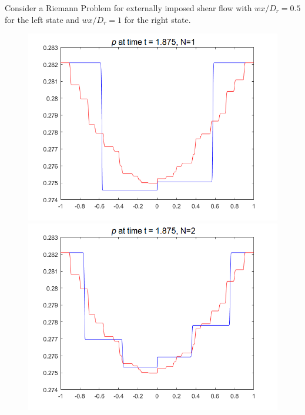 \begin{frame}
	\scriptsize
	Consider a Riemann Problem for externally imposed shear flow with $wx/D_r = 0.5$ for the left state and $wx/D_r = 1$ for the right state.
	\begin{figure}[H]
		\centering
		\begin{minipage}{0.32\textwidth}
			\includegraphics[width=\textwidth]{Bilder_wx/Wavepropa/red=12th_blue=2nd_wx=1_leftDr1_rightDr2_Awp12th}
		\end{minipage}
		\hfill
		\begin{minipage}{0.32\textwidth}
			\includegraphics[width=\textwidth]{Bilder_wx/Wavepropa/red=12th_blue=4th_wx=1_leftDr1_rightDr2_Awp12th}
		\end{minipage}

\end{figure}
\end{frame}
